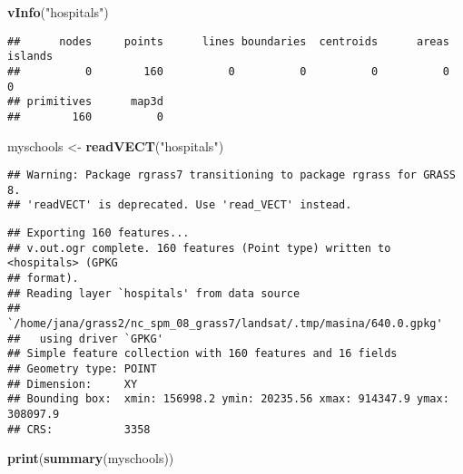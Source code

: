 \documentclass[]{article}
\newenvironment{Shaded}{\begin{snugshade}}{\end{snugshade}}
\newcommand{\KeywordTok}[1]{\textcolor[rgb]{0.13,0.29,0.53}{\textbf{#1}}}
\newcommand{\StringTok}[1]{\textcolor[rgb]{0.31,0.60,0.02}{#1}}
\newcommand{\NormalTok}[1]{#1}
\begin{document}
\begin{Shaded}
\begin{Highlighting}[]
\KeywordTok{vInfo}\NormalTok{(}\StringTok{"hospitals"}\NormalTok{)}
\end{Highlighting}
\end{Shaded}

\begin{verbatim}
##      nodes     points      lines boundaries  centroids      areas    islands 
##          0        160          0          0          0          0          0 
## primitives      map3d 
##        160          0
\end{verbatim}

\begin{Shaded}
\begin{Highlighting}[]
\NormalTok{myschools <-}\StringTok{ }\KeywordTok{readVECT}\NormalTok{(}\StringTok{"hospitals"}\NormalTok{)}
\end{Highlighting}
\end{Shaded}

\begin{verbatim}
## Warning: Package rgrass7 transitioning to package rgrass for GRASS 8.
## 'readVECT' is deprecated. Use 'read_VECT' instead.
\end{verbatim}

\begin{verbatim}
## Exporting 160 features...
## v.out.ogr complete. 160 features (Point type) written to <hospitals> (GPKG
## format).
## Reading layer `hospitals' from data source 
##   `/home/jana/grass2/nc_spm_08_grass7/landsat/.tmp/masina/640.0.gpkg' 
##   using driver `GPKG'
## Simple feature collection with 160 features and 16 fields
## Geometry type: POINT
## Dimension:     XY
## Bounding box:  xmin: 156998.2 ymin: 20235.56 xmax: 914347.9 ymax: 308097.9
## CRS:           3358
\end{verbatim}

\begin{Shaded}
\begin{Highlighting}[]
\KeywordTok{print}\NormalTok{(}\KeywordTok{summary}\NormalTok{(myschools))}
\end{Highlighting}
\end{Shaded}
\end{document}
